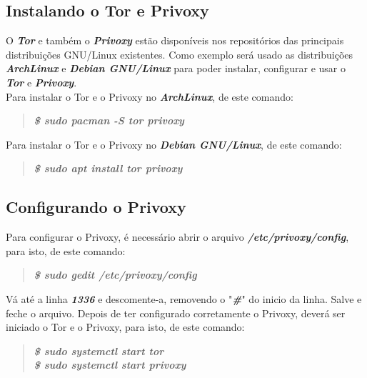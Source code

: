 \documentclass[12pt, letterpaper, Monospace:12]{report}
\begin{document}
\subsection{Instalando o Tor e Privoxy}
	O \textit{\textbf{Tor}} e também o \textit{\textbf{Privoxy}} estão disponíveis nos repositórios das principais distribuições GNU/Linux existentes. Como exemplo será usado as distribuições \textit{\textbf{ArchLinux}} e \textit{\textbf{Debian GNU/Linux}} para poder instalar, configurar e usar o \textit{\textbf{Tor}} e \textit{\textbf{Privoxy}}.\\

Para instalar o Tor e o Privoxy no \textit{\textbf{ArchLinux}}, de este comando:\\

\begin{quote}
	\textit{\textbf{\$ sudo pacman -S tor privoxy}}\\
\end{quote}

Para instalar o Tor e o Privoxy no \textit{\textbf{Debian GNU/Linux}}, de este comando:\\

\begin{quote}
	\textit{\textbf{\$ sudo apt install tor privoxy}}\\
\end{quote}

\subsection{Configurando o Privoxy}
	Para configurar o Privoxy, é necessário abrir o arquivo \textit{\textbf{/etc/privoxy/config}}, para isto, de este comando:\\

\begin{quote}
	\textit{\textbf{\$ sudo gedit /etc/privoxy/config}}\\
\end{quote}

	Vá até a linha \textit{\textbf{1336}} e descomente-a, removendo o "\textit{\textbf{\#}}" do inicio da linha. Salve e feche o arquivo. Depois de ter configurado corretamente o Privoxy, deverá ser iniciado o Tor e o Privoxy, para isto, de este comando:\\

\begin{quote}
	\textit{\textbf{\$ sudo systemctl start tor}}\\
	\textit{\textbf{\$ sudo systemctl start privoxy}}\\
\end{quote}
\end{document}
